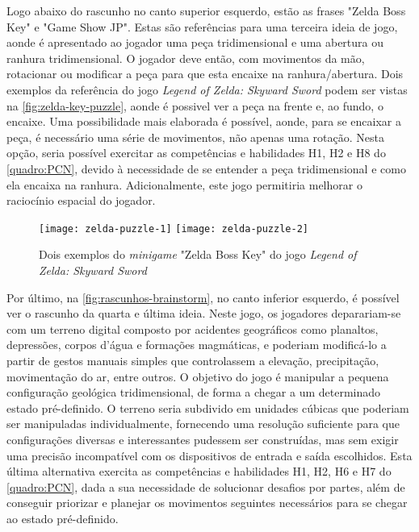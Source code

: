 Logo abaixo do rascunho no canto superior esquerdo, estão as 
frases "Zelda Boss Key" e "Game Show JP". Estas são referências 
para uma terceira ideia de jogo, aonde é apresentado ao jogador 
uma peça tridimensional e uma abertura ou ranhura tridimensional. 
O jogador deve então, com movimentos da mão, rotacionar ou modificar 
a peça para que esta encaixe na ranhura/abertura. Dois exemplos da 
referência do jogo \textit{Legend of Zelda: Skyward Sword} podem 
ser vistas na \autoref{fig:zelda-key-puzzle}, aonde é possivel ver
a peça na frente e, ao fundo, o encaixe. Uma possibilidade mais elaborada 
é possível, aonde, para se encaixar a peça, é necessário uma série 
de movimentos, não apenas uma rotação. Nesta opção, seria possível 
exercitar as competências e habilidades H1, H2 e H8 do 
\autoref{quadro:PCN}, devido à necessidade de se entender a peça 
tridimensional e como ela encaixa na ranhura. Adicionalmente, este 
jogo permitiria melhorar o raciocínio espacial do jogador.

\begin{figure}[h]
	\centering
	\caption{Dois exemplos do \textit{minigame} "Zelda Boss Key" do jogo \textit{Legend of Zelda: Skyward Sword}}
	\texttt{[image: zelda-puzzle-1]}
	\texttt{[image: zelda-puzzle-2]}
	\label{fig:zelda-key-puzzle}
\end{figure}

Por último, na \autoref{fig:rascunhos-brainstorm}, no canto inferior esquerdo,
é possível ver o rascunho da quarta e última ideia. Neste jogo, os 
jogadores deparariam-se com um terreno digital composto por acidentes
geográficos como planaltos, depressões, corpos d'água e formações magmáticas, 
e poderiam modificá-lo a partir de gestos manuais simples que controlassem 
a elevação, precipitação, movimentação do ar, entre outros. O objetivo do jogo
é manipular a pequena configuração geológica tridimensional, de forma a chegar 
a um determinado estado pré-definido. O terreno seria subdivido em unidades 
cúbicas que poderiam ser manipuladas individualmente, fornecendo uma 
resolução suficiente para que configurações diversas e interessantes pudessem 
ser construídas, mas sem exigir uma precisão incompatível com os dispositivos 
de entrada e saída escolhidos. Esta última alternativa exercita as 
competências e habilidades H1, H2, H6 e H7 do \autoref{quadro:PCN}, dada 
a sua necessidade de solucionar desafios por partes, além de conseguir priorizar e
planejar os movimentos seguintes necessários para se chegar ao estado
pré-definido.

